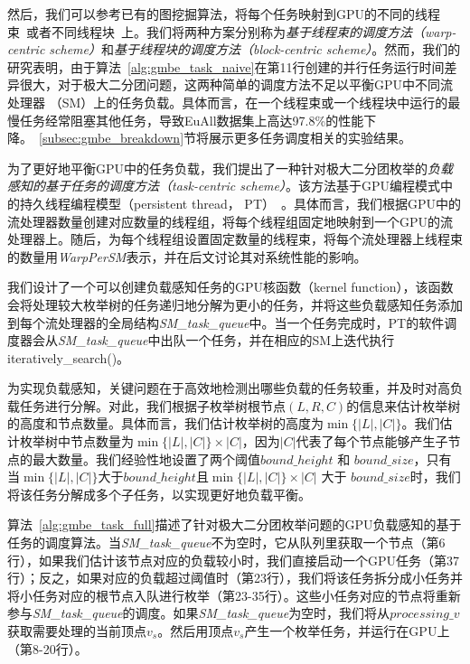 然后，我们可以参考已有的图挖掘算法，将每个任务映射到GPU的不同的线程束~\cite{g2miner22}或者不同线程块~\cite{Kclique22}上。我们将两种方案分别称为\textit{基于线程束的调度方法（warp-centric scheme）}和\textit{基于线程块的调度方法（block-centric scheme）}。然而，我们的研究表明，由于算法~\ref{alg:gmbe_task_naive}在第11行创建的并行任务运行时间差异很大，对于极大二分团问题，这两种简单的调度方法不足以平衡GPU中不同流处理器 （SM）上的任务负载。具体而言，在一个线程束或一个线程块中运行的最慢任务经常阻塞其他任务，导致EuAll数据集上高达97.8\%的性能下降。~\ref{subsec:gmbe_breakdown}节将展示更多任务调度相关的实验结果。




为了更好地平衡GPU中的任务负载，我们提出了一种针对极大二分团枚举的\textit{负载感知的基于任务的调度方法（task-centric scheme）}。该方法基于GPU编程模式中的持久线程编程模型（persistent thread， PT）~\cite{PersistentThread12}。具体而言，我们根据GPU中的流处理器数量创建对应数量的线程组，将每个线程组固定地映射到一个GPU的流处理器上。随后，为每个线程组设置固定数量的线程束，将每个流处理器上线程束的数量用\textit{WarpPerSM}表示，并在后文讨论其对系统性能的影响。



我们设计了一个可以创建负载感知任务的GPU核函数（kernel function），该函数会将处理较大枚举树的任务递归地分解为更小的任务，并将这些负载感知任务添加到每个流处理器的全局结构\textit{SM\_task\_queue}中。当一个任务完成时，PT的软件调度器会从\textit{SM\_task\_queue}中出队一个任务，并在相应的SM上迭代执行\textsf{}{iteratively\_search()}。

为实现负载感知，关键问题在于高效地检测出哪些负载的任务较重，并及时对高负载任务进行分解。对此，我们根据子枚举树根节点$(L,R,C)$的信息来估计枚举树的高度和节点数量。具体而言，我们估计枚举树的高度为$\min\{|L|,|C|\}$。我们估计枚举树中节点数量为$\min\{|L|,|C|\}\times|C|$，因为$|C|$代表了每个节点能够产生子节点的最大数量。我们经验性地设置了两个阈值$bound\_height$ 和 $bound\_size$，只有当$\min\{|L|,|C|\}$大于$bound\_height$且$\min\{|L|,|C|\}\times|C|$ 大于 $bound\_size$时，我们将该任务分解成多个子任务，以实现更好地负载平衡。

算法~\ref{alg:gmbe_task_full}描述了针对极大二分团枚举问题的GPU负载感知的基于任务的调度算法。当\textit{SM\_task\_queue}不为空时，它从队列里获取一个节点（第6行），如果我们估计该节点对应的负载较小时，我们直接启动一个GPU任务（第37行）；反之，如果对应的负载超过阈值时（第23行），我们将该任务拆分成小任务并将小任务对应的根节点入队进行枚举（第23-35行）。这些小任务对应的节点将重新参与\textit{SM\_task\_queue}的调度。如果\textit{SM\_task\_queue}为空时，我们将从$processing\_v$获取需要处理的当前顶点$v_s$。然后用顶点$v_s$产生一个枚举任务，并运行在GPU上（第8-20行）。

